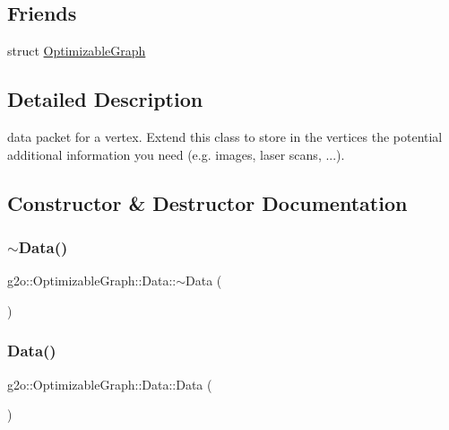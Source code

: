 \subsection*{Friends}
\begin{DoxyCompactItemize}
\item 
struct \mbox{\hyperlink{classg2o_1_1_optimizable_graph_1_1_data_a45d35331ee3deca38c26d1efb6b961ae}{Optimizable\+Graph}}
\end{DoxyCompactItemize}


\subsection{Detailed Description}
data packet for a vertex. Extend this class to store in the vertices the potential additional information you need (e.\+g. images, laser scans, ...). 

\subsection{Constructor \& Destructor Documentation}
\mbox{\label{classg2o_1_1_optimizable_graph_1_1_data_aa81fb1975f34e3aaf4c5110f7778a54e}} 
\subsubsection{\texorpdfstring{$\sim$\+Data()}{~Data()}}
{\footnotesize\ttfamily g2o\+::\+Optimizable\+Graph\+::\+Data\+::$\sim$\+Data (\begin{DoxyParamCaption}{ }\end{DoxyParamCaption})\hspace{0.3cm}{\ttfamily [virtual]}}

\mbox{\label{classg2o_1_1_optimizable_graph_1_1_data_a647b9fcb65aa8309f7103635135ea513}} 
\subsubsection{\texorpdfstring{Data()}{Data()}}
{\footnotesize\ttfamily g2o\+::\+Optimizable\+Graph\+::\+Data\+::\+Data (\begin{DoxyParamCaption}{ }\end{DoxyParamCaption})}



